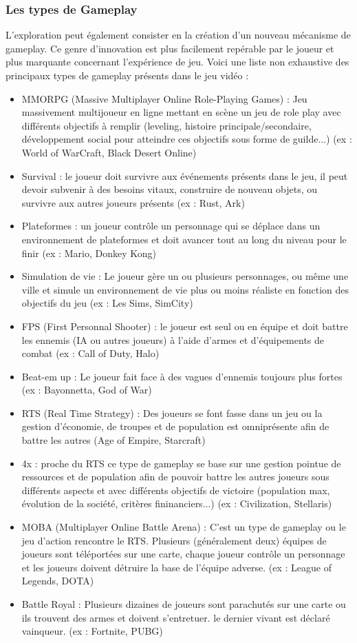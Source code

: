 \subsubsection{Les types de Gameplay}
L'exploration peut également consister en la création d'un nouveau mécanisme de gameplay. Ce genre d'innovation est plus facilement repérable par le joueur et plus marquante concernant l'expérience de jeu. Voici une liste non exhaustive des principaux types de gameplay présents dans le jeu vidéo :
\begin{itemize}
    \item MMORPG (Massive Multiplayer Online Role-Playing Games) : Jeu massivement multijoueur en ligne mettant en scène un jeu de role play avec différents objectifs à remplir (leveling, histoire principale/secondaire, développement social pour atteindre ces objectifs sous forme de guilde...) (ex : World of WarCraft, Black Desert Online)
    \item Survival : le joueur doit survivre aux événements présents dans le jeu, il peut devoir subvenir à des besoins vitaux, construire de nouveau objets, ou survivre aux autres joueurs présents (ex : Rust, Ark)
    \item Plateformes : un joueur contrôle un personnage qui se déplace dans un environnement de plateformes et doit avancer tout au long du niveau pour le finir (ex : Mario, Donkey Kong)
    \item Simulation de vie : Le joueur gère un ou plusieurs personnages, ou même une ville et simule un environnement de vie plus ou moins réaliste en fonction des objectifs du jeu (ex : Les Sims, SimCity)
    \item FPS (First Personnal Shooter) : le joueur est seul ou en équipe et doit battre les ennemis (IA ou autres joueurs) à l'aide d'armes et d'équipements de combat (ex : Call of Duty, Halo)
    \item Beat-em up : Le joueur fait face à des vagues d'ennemis toujours plus fortes (ex : Bayonnetta, God of War)
    \item RTS (Real Time Strategy) : Des joueurs se font fasse dans un jeu ou la gestion d'économie, de troupes et de population est omniprésente afin de battre les autres (Age of Empire, Starcraft)
    \item 4x : proche du RTS ce type de gameplay se base sur une gestion pointue de ressources et de population afin de pouvoir battre les autres joueurs sous différents aspects et avec différents objectifs de victoire (population max, évolution de la société, critères fininanciers...) (ex : Civilization, Stellaris)
    \item MOBA (Multiplayer Online Battle Arena) : C'est un type de gameplay ou le jeu d'action rencontre le RTS. Plusieurs (généralement deux) équipes de joueurs sont téléportées sur une carte, chaque joueur contrôle un personnage et les joueurs doivent détruire la base de l'équipe adverse. (ex : League of Legends, DOTA)
    \item Battle Royal : Plusieurs dizaines de joueurs sont parachutés sur une carte ou ils trouvent des armes et doivent s'entretuer. le dernier vivant est déclaré vainqueur. (ex : Fortnite, PUBG)
\end{itemize}

